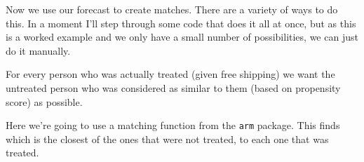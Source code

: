 \documentclass[
]{book}
\newenvironment{Shaded}{\begin{snugshade}}{\end{snugshade}}
\newcommand{\DataTypeTok}[1]{\textcolor[rgb]{0.13,0.29,0.53}{#1}}
\newcommand{\DecValTok}[1]{\textcolor[rgb]{0.00,0.00,0.81}{#1}}
\newcommand{\KeywordTok}[1]{\textcolor[rgb]{0.13,0.29,0.53}{\textbf{#1}}}
\newcommand{\NormalTok}[1]{#1}
\newcommand{\OperatorTok}[1]{\textcolor[rgb]{0.81,0.36,0.00}{\textbf{#1}}}
\newcommand{\StringTok}[1]{\textcolor[rgb]{0.31,0.60,0.02}{#1}}
\begin{document}
\begin{Shaded}
\end{Shaded}

Now we use our forecast to create matches. There are a variety of ways to do this. In a moment I'll step through some code that does it all at once, but as this is a worked example and we only have a small number of possibilities, we can just do it manually.

For every person who was actually treated (given free shipping) we want the untreated person who was considered as similar to them (based on propensity score) as possible.

\begin{Shaded}
\end{Shaded}

Here we're going to use a matching function from the \texttt{arm} package. This finds which is the closest of the ones that were not treated, to each one that was treated.

\begin{Shaded}
\end{Shaded}
\end{document}
